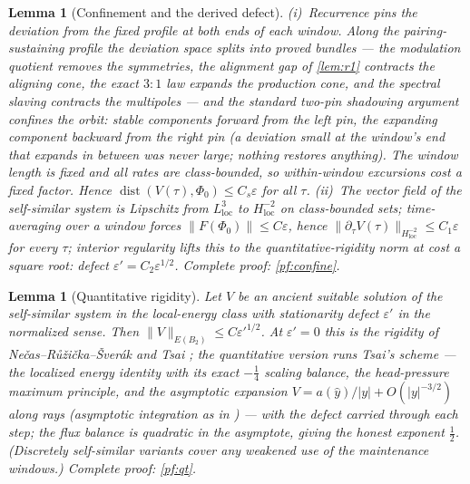 \documentclass[11pt,letterpaper]{amsart}
\newtheorem{lemma}[theorem]{Lemma}
\theoremstyle{definition}
\theoremstyle{remark}
\newcommand{\norm}[1]{\lVert #1 \rVert}
\newcommand{\abs}[1]{\lvert #1 \rvert}
\begin{document}
\begin{lemma}[Confinement and the derived defect]\label{lem:confine}
\textup{(i)}~Recurrence pins the deviation from the fixed profile at \emph{both} ends
of each window. Along the pairing-sustaining profile the deviation space splits into
proved bundles --- the modulation quotient removes the symmetries, the alignment gap
of \cref{lem:r1} contracts the aligning cone, the exact $3{:}1$ law expands the
production cone, and the spectral slaving contracts the multipoles --- and the
standard two-pin shadowing argument confines the orbit: stable components forward
from the left pin, the expanding component \emph{backward} from the right pin (a
deviation small at the window's end that expands in between was never large; nothing
restores anything). The window length is fixed and all rates are class-bounded, so
within-window excursions cost a fixed factor. Hence
$\operatorname{dist}(V(\tau),\Phi_0)\le C_s\varepsilon$ for all $\tau$.
\textup{(ii)}~The vector field of the self-similar system is Lipschitz from
$L^3_{\mathrm{loc}}$ to $H^{-2}_{\mathrm{loc}}$ on class-bounded sets; time-averaging
over a window forces $\norm{F(\Phi_0)}\le C\varepsilon$, hence
$\norm{\partial_\tau V(\tau)}_{H^{-2}_{\mathrm{loc}}}\le C_1\varepsilon$ for every
$\tau$; interior regularity lifts this to the quantitative-rigidity norm at cost a
square root: defect $\varepsilon'=C_2\varepsilon^{1/2}$. Complete proof:
\cref{pf:confine}.
\end{lemma}

\begin{lemma}[Quantitative rigidity]\label{lem:qt}
Let $V$ be an ancient suitable solution of the self-similar system in the local-energy
class with stationarity defect $\varepsilon'$ in the normalized sense. Then
$\norm{V}_{E(B_2)}\le C\varepsilon'^{1/2}$. At $\varepsilon'=0$ this is the rigidity
of Ne\v{c}as--R\r{u}\v{z}i\v{c}ka--\v{S}ver\'ak and Tsai \cite{NRS1996,Tsai1998}; the
quantitative version runs Tsai's scheme --- the localized energy identity with its
exact $-\tfrac14$ scaling balance, the head-pressure maximum principle, and the
asymptotic expansion $V=a(\hat y)/\abs{y}+O(\abs{y}^{-3/2})$ along rays (asymptotic
integration as in \cite{CoddingtonLevinson1955}) --- with the defect carried through
each step; the flux balance is quadratic in the asymptote, giving the honest exponent
$\tfrac12$. \textup{(}Discretely self-similar variants
\cite{Tsai2014,ChaeWolf2017} cover any weakened use of the maintenance windows.\textup{)}
Complete proof: \cref{pf:qt}.
\end{lemma}
\end{document}
